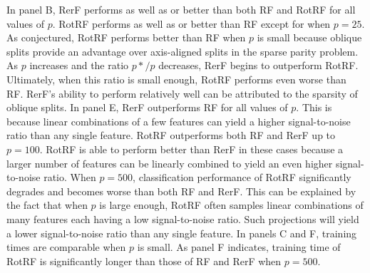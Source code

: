 \documentclass[10pt]{article}
\begin{document}
In panel B, RerF performs as well as or better than both RF and RotRF for all values of $p$. RotRF performs as well as or better than RF except for when $p = 25$. As conjectured, RotRF performs better than RF when $p$ is small because oblique splits provide an advantage over axis-aligned splits in the sparse parity problem. As $p$ increases and the ratio $p*/p$ decreases, RerF begins to outperform RotRF. Ultimately, when this ratio is small enough, RotRF performs even worse than RF. RerF's ability to perform relatively well can be attributed to the sparsity of oblique splits. In panel E, RerF outperforms RF for all values of $p$. This is because linear combinations of a few features can yield a higher signal-to-noise ratio than any single feature. RotRF outperforms both RF and RerF up to $p = 100$. RotRF is able to perform better than RerF in these cases because a larger number of features can be linearly combined to yield an even higher signal-to-noise ratio. When $p = 500$, classification performance of RotRF significantly degrades and becomes worse than both RF and RerF. This can be explained by the fact that when $p$ is large enough, RotRF often samples linear combinations of many features each having a low signal-to-noise ratio. Such projections will yield a lower signal-to-noise ratio than any single feature. In panels C and F, training times are comparable when $p$ is small. As panel F indicates, training time of RotRF is significantly longer than those of RF and RerF when $p = 500$. 
\end{document}
